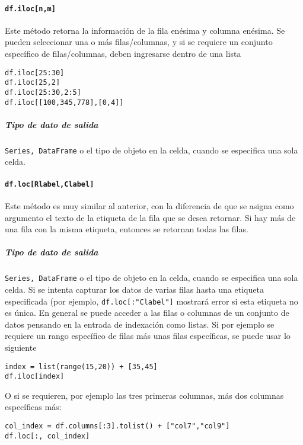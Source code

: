 \paragraph{\texttt{df.iloc[n,m]}} Este método retorna la información de la fila enésima y columna enésima. Se pueden seleccionar una o más filas/columnas, y si se requiere un conjunto específico de filas/columnas, deben ingresarse dentro de una lista
\begin{verbatim}
df.iloc[25:30]
df.iloc[25,2]
df.iloc[25:30,2:5]
df.iloc[[100,345,778],[0,4]]
\end{verbatim}
\subparagraph{Tipo de dato de salida} \texttt{Series, DataFrame} o el tipo de objeto en la celda, cuando se especifica una sola celda.
\paragraph{\texttt{df.loc[Rlabel,Clabel]}} Este método es muy similar al anterior, con la diferencia de que se asigna como argumento el texto de la etiqueta de la fila que se desea retornar. Si hay más de una fila con la misma etiqueta, entonces se retornan todas las filas.
\subparagraph{Tipo de dato de salida} \texttt{Series, DataFrame} o el tipo de objeto en la celda, cuando se especifica una sola celda.
Si se intenta capturar los datos de varias filas hasta una etiqueta especificada (por ejemplo, \texttt{df.loc[:"Clabel"]} mostrará error si esta etiqueta no es única.
En general se puede acceder a las filas o columnas de un conjunto de datos pensando en la entrada de indexación como listas. Si por ejemplo se requiere un rango específico de filas más unas filas específicas, se puede usar lo siguiente
\begin{verbatim}
index = list(range(15,20)) + [35,45]
df.iloc[index]
\end{verbatim}
O si se requieren, por ejemplo las tres primeras columnas, más dos columnas específicas más:
\begin{verbatim}
col_index = df.columns[:3].tolist() + ["col7","col9"]
df.loc[:, col_index]
\end{verbatim}

